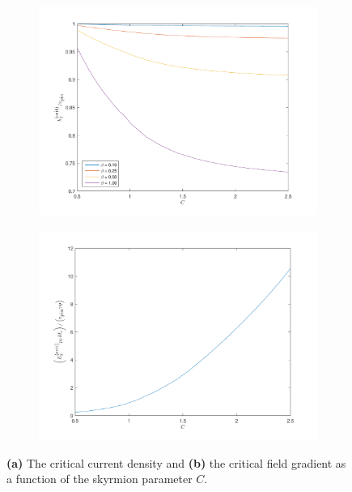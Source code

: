 \begin{figure}[h!]
\centering
\begin{subfigure}{.49\textwidth}
  \centering
  \includegraphics[width=\linewidth]{Figures/CritCurrent.pdf}
  \caption{}
  \label{fig:CritCurrent}
\end{subfigure}
\begin{subfigure}{.49\textwidth}
  \centering
  \includegraphics[width=\linewidth]{Figures/CritField.pdf}
  \caption{}
  \label{fig:CritField}
\end{subfigure}
\caption{\textbf{(a)} The critical current density and \textbf{(b)} the critical field gradient as a function of the skyrmion parameter $C$.}
\label{fig:CritCurrentField}
\end{figure}

